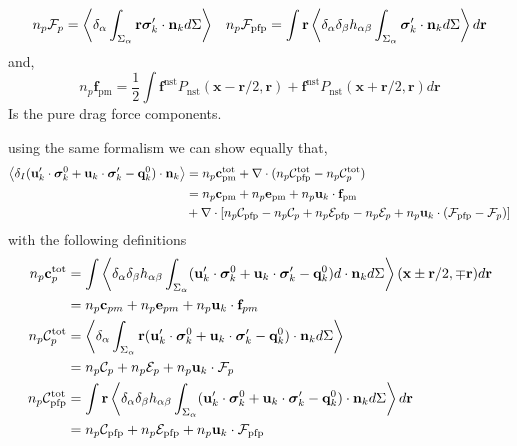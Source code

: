 \begin{align*}
    n_p \mathcal{F}_p 
    = \left<\delta_\alpha \int_{\Sigma_\alpha}  \textbf{r} \bm{\sigma}_k' \cdot \textbf{n}_k d\Sigma \right>
    &&
    n_p \mathcal{F}_\text{pfp} 
    = \int \textbf{r} \left<\delta_\alpha  \delta_\beta  h_{\alpha\beta}\int_{\Sigma_\alpha} \bm{\sigma}_k' \cdot \textbf{n}_k d\Sigma \right> d\textbf{r}
\end{align*} 
and, 
\begin{equation*}
    n_p \textbf{f}_\text{pm} 
    = \frac{1}{2}\int \textbf{f}^\text{nst}P_\text{nst}(\textbf{x} - \textbf{r}/2, \textbf{r}) + \textbf{f}^\text{nst}P_\text{nst}(\textbf{x} + \textbf{r}/2,\textbf{r}) d\textbf{r}
\end{equation*}
Is the pure drag force components. 

using the same formalism we can show equally that, 
\begin{align*}
    \left<\delta_I (\textbf{u}_k' \cdot \bm{\sigma}_k^0 + \textbf{u}_k \cdot \bm{\sigma}_k' - \textbf{q}_k^0)\cdot \textbf{n}_k\right>
    &= n_p \textbf{c}_\text{pm}^\text{tot} 
    + \mathbf{\nabla}\cdot (n_p \mathcal{C}_\text{pfp}^\text{tot} - n_p \mathcal{C}_p^\text{tot})\\
    &=
    n_p \textbf{c}_\text{pm} 
    + n_p \textbf{e}_\text{pm} 
    + n_p \textbf{u}_k \cdot \textbf{f}_\text{pm}\\
    &+ \mathbf{\nabla}\cdot [n_p \mathcal{C}_\text{pfp} - n_p \mathcal{C}_p + n_p \mathcal{E}_\text{pfp} - n_p \mathcal{E}_p + n_p \textbf{u}_k \cdot (\mathcal{F}_\text{pfp} - \mathcal{F}_p) ]
\end{align*}
with the following definitions
\begin{align*}
    n_p \textbf{c}_p^\text{tot}
    &= \int \left<\delta_\alpha \delta_\beta h_{\alpha\beta}\int_{\Sigma_\alpha}  (\textbf{u}_k' \cdot \bm{\sigma}_k^0 + \textbf{u}_k \cdot \bm{\sigma}_k' - \textbf{q}_k^0) d\cdot \textbf{n}_k d\Sigma \right>(\textbf{x}\pm \textbf{r}/2,\mp\textbf{r}) d\textbf{r}\\
    &= n_p \textbf{c}_{pm} 
    + n_p \textbf{e}_{pm} 
    + n_p \textbf{u}_k \cdot \textbf{f}_{pm} 
    \\
    n_p \mathcal{C}_p^\text{tot}
    &= \left<\delta_\alpha \int_{\Sigma_\alpha}  \textbf{r} (\textbf{u}_k' \cdot \bm{\sigma}_k^0 + \textbf{u}_k \cdot \bm{\sigma}_k' - \textbf{q}_k^0)\cdot \textbf{n}_k d\Sigma \right>\\
    &= n_p \mathcal{C}_p 
    + n_p \mathcal{E}_p 
    + n_p \textbf{u}_k \cdot \mathcal{F}_p 
    \\
    n_p \mathcal{C}_\text{pfp}^\text{tot} 
    &= \int \textbf{r} \left<\delta_\alpha  \delta_\beta  h_{\alpha\beta}\int_{\Sigma_\alpha} (\textbf{u}_k' \cdot \bm{\sigma}_k^0 + \textbf{u}_k \cdot \bm{\sigma}_k' - \textbf{q}_k^0)\cdot \textbf{n}_k d\Sigma \right> d\textbf{r} \\
    &= n_p \mathcal{C}_\text{pfp} 
    +n_p \mathcal{E}_\text{pfp} 
    + n_p \textbf{u}_k \cdot \mathcal{F}_\text{pfp} \\
\end{align*} 
